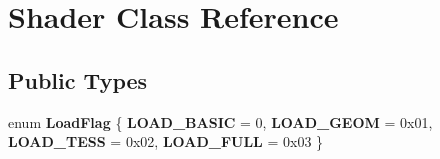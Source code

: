 \hypertarget{class_shader}{}\section{Shader Class Reference}
\label{class_shader}
\subsection*{Public Types}
\begin{DoxyCompactItemize}
\item 
\hypertarget{class_shader_a2ac80773f1fe928469ce4ad5f9a05035}{}enum {\bfseries Load\+Flag} \{ {\bfseries L\+O\+A\+D\+\_\+\+B\+A\+S\+I\+C} = 0, 
{\bfseries L\+O\+A\+D\+\_\+\+G\+E\+O\+M} = 0x01, 
{\bfseries L\+O\+A\+D\+\_\+\+T\+E\+S\+S} = 0x02, 
{\bfseries L\+O\+A\+D\+\_\+\+F\+U\+L\+L} = 0x03
 \}\label{class_shader_a2ac80773f1fe928469ce4ad5f9a05035}

\end{DoxyCompactItemize}
